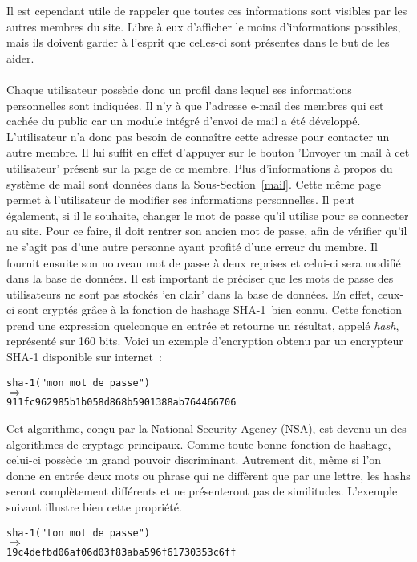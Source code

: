 \documentclass[12pt, a4paper, oneside]{article}
\begin{document}
    Il est cependant utile de rappeler que toutes ces informations sont visibles par les autres membres du site. Libre à eux d'afficher le moins d'informations possibles, mais ils doivent garder à l'esprit que celles-ci sont présentes dans le but de les aider.\\\\
    \indent Chaque utilisateur possède donc un profil dans lequel ses informations personnelles sont indiquées. Il n'y à que l'adresse e-mail des membres qui est cachée du public car un module intégré d'envoi de mail a été développé. L'utilisateur n'a donc pas besoin de connaître cette adresse pour contacter un autre membre. Il lui suffit en effet d'appuyer sur le bouton 'Envoyer un mail à cet utilisateur' présent sur la page de ce membre. Plus d'informations à propos du système de mail sont données dans la Sous-Section~\ref{mail}. Cette même page permet à l'utilisateur de modifier ses informations personnelles. Il peut également, si il le souhaite, changer le mot de passe qu'il utilise pour se connecter au site. Pour ce faire, il doit rentrer son ancien mot de passe, afin de vérifier qu'il ne s'agit pas d'une autre personne ayant profité d'une erreur du membre. Il fournit ensuite son nouveau mot de passe à deux reprises et celui-ci sera modifié dans la base de données. Il est important de préciser que les mots de passe des utilisateurs ne sont pas stockés 'en clair' dans la base de données. En effet, ceux-ci sont cryptés grâce à la fonction de hashage SHA-1~\cite{SHA-1}bien connu. Cette fonction prend une expression quelconque en entrée et retourne un résultat, appelé \textit{hash}, représenté sur 160 bits.  Voici un exemple d'encryption obtenu par un encrypteur SHA-1 disponible sur internet~\cite{sha-1-encrypter}:
    \begin{center}
        \verb?sha-1("mon mot de passe")?\\
        $\Longrightarrow$\\
        \verb?911fc962985b1b058d868b5901388ab764466706?\\
    \end{center}
    Cet algorithme, conçu par la National Security Agency (NSA), est devenu un des algorithmes de cryptage principaux. Comme toute bonne fonction de hashage, celui-ci possède un grand pouvoir discriminant. Autrement dit, même si l'on donne en entrée deux mots ou phrase qui ne diffèrent que par une lettre, les hashs seront complètement différents et ne présenteront pas de similitudes. L'exemple suivant illustre bien cette propriété.
    \begin{center}
        \verb?sha-1("ton mot de passe")?\\
        $\Longrightarrow$\\
        \verb?19c4defbd06af06d03f83aba596f61730353c6ff?
    \end{center}
\end{document}
